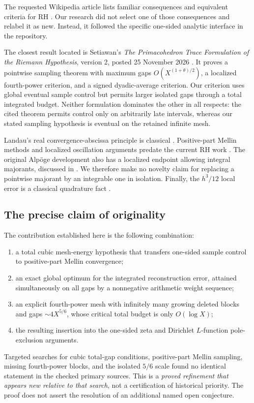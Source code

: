\documentclass[11pt]{article}
\theoremstyle{definition}
\begin{document}
The requested Wikipedia article lists familiar consequences and
equivalent criteria for RH \cite{wiki}. Our research did not select one
of those consequences and relabel it as new. Instead, it followed the
specific one-sided analytic interface in the repository.

The closest result located is Setiawan's \emph{The Primacohedron Trace
Formulation of the Riemann Hypothesis}, version 2, posted
25 November 2026 \cite{setiawan}. It proves a pointwise sampling theorem
with maximum gaps \(O(X^{(1+\theta)/2})\), a localized fourth-power
criterion, and a signed dyadic-average criterion. Our criterion uses
global eventual sample control but permits larger isolated gaps through
a total integrated budget. Neither formulation dominates the other in
all respects: the cited theorem permits control only on arbitrarily
late intervals, whereas our stated sampling hypothesis is eventual on
the retained infinite mesh.

Landau's real convergence-abscissa principle is classical
\cite{landau}. Positive-part Mellin methods and localized oscillation
arguments predate the current RH work \cite{brs}. The original
Alp\"oge development also has a localized endpoint allowing integral
majorants, discussed in \cite{odesky}. We therefore make no novelty
claim for replacing a pointwise majorant by an integrable one in
isolation. Finally, the \(h^3/12\) local error is a classical
quadrature fact \cite{dlmf}.

\subsection{The precise claim of originality}

The contribution established here is the following combination:
\begin{enumerate}
\item a total cubic mesh-energy hypothesis that transfers one-sided
sample control to positive-part Mellin convergence;
\item an exact global optimum for the integrated reconstruction error,
attained simultaneously on all gaps by a nonnegative arithmetic weight
sequence;
\item an explicit fourth-power mesh with infinitely many growing
deleted blocks and gaps \(\sim4X^{5/6}\), whose critical total budget
is only \(O(\log X)\);
\item the resulting insertion into the one-sided zeta and Dirichlet
\(L\)-function pole-exclusion arguments.
\end{enumerate}
Targeted searches for cubic total-gap conditions, positive-part Mellin
sampling, missing fourth-power blocks, and the isolated \(5/6\) scale
found no identical statement in the checked primary sources. This is a
\emph{proved refinement that appears new relative to that search}, not a
certification of historical priority. The proof does not assert the
resolution of an additional named open conjecture.
\end{document}

